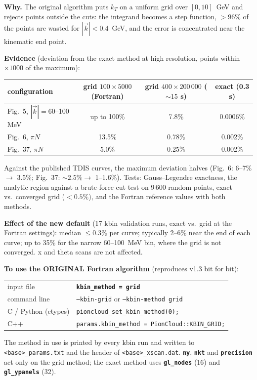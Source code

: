 \documentclass[11pt,a4paper]{article}
\newcommand{\key}[1]{\texttt{\textbf{#1}}}
\begin{document}
\textbf{Why.} The original algorithm puts $k_T$ on a uniform grid over
$[0,10]$~GeV and rejects points outside the cuts: the integrand becomes a step
function, $>96\%$ of the points are wasted for $|\vec k|<0.4$~GeV, and the
error is concentrated near the kinematic end point.

\textbf{Evidence} (deviation from the exact method at high resolution, points
within $\times1000$ of the maximum):
\begin{center}
\begin{tabular}{lccc}
\toprule
configuration & grid $100\times5000$ (Fortran) & grid $400\times200\,000$ ($\sim15$ s) & exact (0.3 s) \\
\midrule
Fig.~5, $|\vec k|=60$--100 MeV & up to 100\% & 7.8\% & 0.0006\% \\
Fig.~6, $\pi N$ & 13.5\% & 0.78\% & 0.002\% \\
Fig.~37, $\pi N$ & 5.0\% & 0.25\% & 0.002\% \\
\bottomrule
\end{tabular}
\end{center}
Against the published TDIS curves, the maximum deviation halves (Fig.~6:
6--7\% $\to$ 3.5\%; Fig.~37: $\sim2.5\%\to$ 1--1.6\%).  Tests: Gauss--Legendre
exactness, the analytic region against a brute-force cut test on 9\,600
random points, exact vs.\ converged grid ($<0.5\%$), and the Fortran reference
values with both methods.

\textbf{Effect of the new default} (17 kbin validation runs, exact vs.\ grid
at the Fortran settings): median $\le0.3\%$ per curve; typically 2--6\% near
the end of each curve; up to 35\% for the narrow 60--100~MeV bin, where the
grid is not converged.  x and theta scans are not affected.

\textbf{To use the ORIGINAL Fortran algorithm} (reproduces v1.3 bit for bit):
\begin{center}
\begin{tabular}{ll}
\toprule
input file & \key{kbin\_method = grid} \\
command line & \texttt{--kbin-grid} \quad or \quad \texttt{--kbin-method grid} \\
C / Python (ctypes) & \texttt{pioncloud\_set\_kbin\_method(0);} \\
C++ & \texttt{params.kbin\_method = PionCloud::KBIN\_GRID;} \\
\bottomrule
\end{tabular}
\end{center}
The method in use is printed by every kbin run and written to
\texttt{<base>\_params.txt} and the header of \texttt{<base>\_xscan.dat}.
\key{ny}, \key{nkt} and \key{precision} act only on the grid method; the exact
method uses \key{gl\_nodes} (16) and \key{gl\_ypanels} (32).
\end{document}
